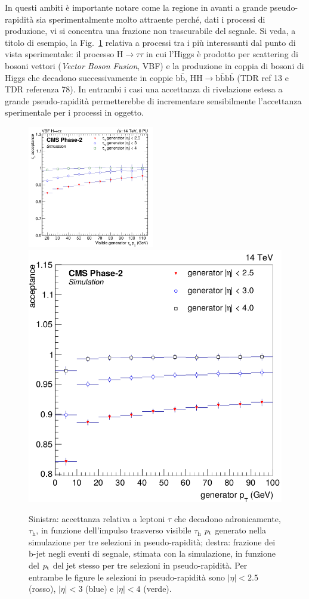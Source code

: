In questi ambiti \`e importante notare come la regione in avanti a grande pseudo-rapidit\`a sia sperimentalmente molto attraente perch\'e, dati i processi di produzione, vi si concentra una frazione non trascurabile del segnale. Si veda, a titolo di esempio, la Fig.~\ref{fig:VBFHtt_HH4b} relativa a processi tra i pi\`u interessanti dal punto di vista sperimentale: il processo H$\rightarrow \tau\tau$ in cui l'Higgs \`e prodotto per scattering di bosoni vettori ({\em Vector Boson Fusion}, VBF) e la produzione in coppia di bosoni di Higgs che decadono successivamente in coppie $\mathrm{b}\overline{\mathrm{b}}$, $\mathrm{HH}\rightarrow \mathrm{b}\overline{\mathrm{b}}\mathrm{b}\overline{\mathrm{b}}$ (TDR ref 13 e TDR referenza 78). In entrambi i casi una accettanza di rivelazione estesa a grande pseudo-rapidit\`a permetterebbe di incrementare sensibilmente l'accettanza sperimentale per i processi in oggetto.
\begin{figure}[t]
\centering
\includegraphics[width=0.49\textwidth]{Immagini/VBF_tau_acceptance}
\hfill
\includegraphics[width=0.48\linewidth]{Immagini/HH4bacc}
\caption{Sinistra: accettanza relativa a leptoni $\tau$ che decadono adronicamente, $\tau_{\mathrm{h}}$, in funzione dell'impulso trasverso visibile  $\tau_{\mathrm{h}}$ ${p_{\rm t}}$ generato nella simulazione per tre selezioni in pseudo-rapidit\`a; destra: frazione dei b-jet negli eventi di segnale, stimata con la simulazione, in funzione del ${p_{\rm t}}$ del jet stesso per tre selezioni in pseudo-rapidit\`a. Per entrambe le figure le selezioni in pseudo-rapidit\`a sono $|\eta|<2.5$ (rosso), $|\eta|<3$ (blue) e $|\eta|<4$ (verde).
}
\label{fig:VBFHtt_HH4b}
\end{figure}

